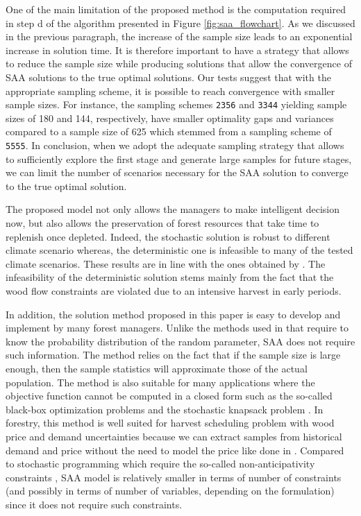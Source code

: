 \documentclass[forests,article,submit,moreauthors,pdftex]{Definitions/mdpi}
\begin{document}
One of the main limitation of the proposed method is the computation required in step d of the algorithm  presented in Figure \ref{fig:saa_flowchart}. As we discussed in the previous paragraph, the increase of the sample size leads to an exponential increase in solution time. It is therefore important to have a strategy that allows to reduce the sample size while producing solutions that allow the convergence of SAA solutions to the true optimal solutions. Our tests suggest that with the appropriate sampling scheme, it is possible to reach convergence with smaller sample sizes. For instance, the sampling schemes  \texttt{2356} and \texttt{3344} yielding  sample sizes of 180 and 144, respectively, have smaller optimality gaps and variances compared to a sample size of 625 which stemmed from a sampling scheme of \texttt{5555}. 
In conclusion, when we adopt the adequate sampling strategy that allows to sufficiently explore the first stage and generate large samples for future stages, we can limit the number of scenarios necessary for the SAA solution to converge to the true  optimal solution. 

The proposed model not only allows the managers to make intelligent decision now, but also allows the preservation of forest resources that take time to replenish once depleted. Indeed, the stochastic solution is robust to different climate scenario whereas, the deterministic one is infeasible to many of the tested climate scenarios. These results are in line with the ones obtained by \cite{Alvarez-Miranda2018, Garcia-Gonzalo2020}. The infeasibility of the deterministic solution stems mainly from the fact that the wood flow constraints are violated due to an intensive harvest in early periods. 

In addition, the  solution method proposed in this paper is easy to develop and implement  by many forest managers. Unlike the methods used in \cite{Garcia-Gonzalo2016, Garcia-Gonzalo2020} that require to know the probability distribution of the random parameter, SAA does not require such information. The method relies on the fact that if the sample size is large enough, then the sample statistics  will approximate those of the actual population. The method is also suitable for many applications where the objective function cannot be computed in a closed form such as the so-called black-box optimization problems \citep{Kim2011} and the stochastic knapsack problem \citep{Kleywegt2001}. In forestry, this method is well suited for harvest scheduling problem with wood price and demand uncertainties because we can extract samples from historical demand and price without the need to model the price like done in \cite{Rios2016, Alonso-Ayuso2018}.
Compared to stochastic programming which require the so-called non-anticipativity constraints \cite{Bagaram__AD, Garcia-Gonzalo2020}, SAA model is relatively smaller in terms of number of constraints (and possibly in terms of number of variables, depending on the formulation) since it does not require such constraints.
\end{document}
